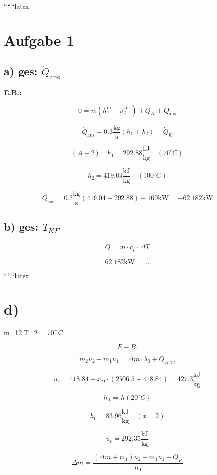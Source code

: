 
``````latex


\section*{Aufgabe 1}

\subsection*{a) ges: $\dot{Q}_{\text{aus}}$}

\textbf{E.B.:}

\[
0 = \dot{m} (h_1^{\text{in}} - h_2^{\text{aus}}) + \dot{Q}_K + \dot{Q}_{\text{aus}}
\]

\[
\dot{Q}_{\text{aus}} = 0.3 \frac{\text{kg}}{\text{s}} (h_1 + h_2) - \dot{Q}_K
\]

\[
(A-2) \quad h_1 = 292.88 \frac{\text{kJ}}{\text{kg}} \quad (70^\circ C)
\]

\[
h_2 = 419.04 \frac{\text{kJ}}{\text{kg}} \quad (100^\circ C)
\]

\[
\dot{Q}_{\text{aus}} = 0.3 \frac{\text{kg}}{\text{s}} (419.04 - 292.88) - 100 \text{kW} = -62.182 \text{kW}
\]

\subsection*{b) ges: $T_{KF}$}

\[
\dot{Q} = \dot{m} \cdot c_p \cdot \Delta T
\]

\[
62.182 \text{kW} = \ldots
\]

``````latex


\section*{d)}

 \quad \Delta m_{12} \quad \Rightarrow \quad T_2 = 70^\circ C

\[
E - B.
\]

\[
m_2 u_2 - m_1 u_1 = \Delta m \cdot h_0 + Q_{R,12}
\]

\[
u_1 = 418.84 + x_D \cdot (2506.5 - 418.84) = 427.3 \frac{\text{kJ}}{\text{kg}}
\]

\[
h_0 \Rightarrow h(20^\circ C)
\]

\[
h_0 = 83.96 \frac{\text{kJ}}{\text{kg}} \quad (x=2)
\]

\[
u_c = 292.35 \frac{\text{kJ}}{\text{kg}}
\]

\[
\Delta m = \frac{(\Delta m + m_1) u_2 - m_1 u_1 - Q_R}{h_0}
\]

